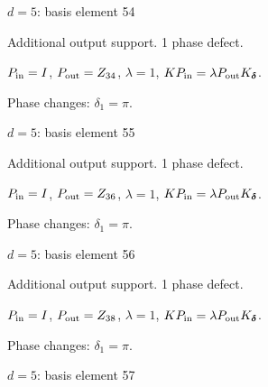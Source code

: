 \vfill
{\footnotesize\texttt{}}
\newpage
{}
{\Large $d=5$: basis element 54}\par
Additional output support. 1 phase defect.
\begin{center}
\end{center}
\vspace{-1mm}
$P_{\rm in}=I$, \quad $P_{\rm out}=Z_{34}$, \quad $\lambda=1$, \qquad $K P_{\rm in}=\lambda P_{\rm out}K_{\boldsymbol\delta}$.
\par\smallskip\begin{minipage}{.98\linewidth}\small Phase changes: $\delta_{1}=\pi$.\end{minipage}
\vfill
{\footnotesize\texttt{}}
\newpage
{}
{\Large $d=5$: basis element 55}\par
Additional output support. 1 phase defect.
\begin{center}
\end{center}
\vspace{-1mm}
$P_{\rm in}=I$, \quad $P_{\rm out}=Z_{36}$, \quad $\lambda=1$, \qquad $K P_{\rm in}=\lambda P_{\rm out}K_{\boldsymbol\delta}$.
\par\smallskip\begin{minipage}{.98\linewidth}\small Phase changes: $\delta_{1}=\pi$.\end{minipage}
\vfill
{\footnotesize\texttt{}}
\newpage
{}
{\Large $d=5$: basis element 56}\par
Additional output support. 1 phase defect.
\begin{center}
\end{center}
\vspace{-1mm}
$P_{\rm in}=I$, \quad $P_{\rm out}=Z_{38}$, \quad $\lambda=1$, \qquad $K P_{\rm in}=\lambda P_{\rm out}K_{\boldsymbol\delta}$.
\par\smallskip\begin{minipage}{.98\linewidth}\small Phase changes: $\delta_{1}=\pi$.\end{minipage}
\vfill
{\footnotesize\texttt{}}
\newpage
{}
{\Large $d=5$: basis element 57}\par
